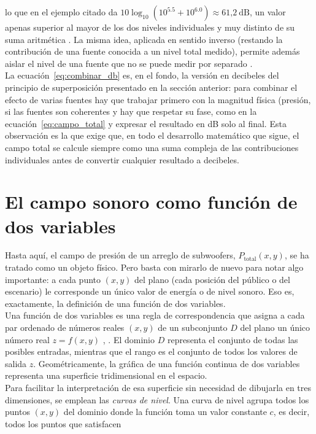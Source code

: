 lo que en el ejemplo citado da $10\log_{10}(10^{5.5}+10^{6.0})\approx
61\text{,}2\ \text{dB}$, un valor apenas superior al mayor de los dos
niveles individuales y muy distinto de su suma aritmética
\cite[pág.~36]{everest2001}. La misma idea, aplicada en sentido inverso
(restando la contribución de una fuente conocida a un nivel total
medido), permite además aislar el nivel de una fuente que no se puede
medir por separado \cite[pág.~36]{everest2001}.\\

La ecuación~\eqref{eq:combinar_db} es, en el fondo, la versión en
decibeles del principio de superposición presentado en la sección
anterior: para combinar el efecto de varias fuentes hay que trabajar
primero con la magnitud física (presión, si las fuentes son coherentes
y hay que respetar su fase, como en la
ecuación~\eqref{eq:campo_total} y expresar el resultado en dB solo al
final. Esta observación es la que exige que, en todo el desarrollo
matemático que sigue, el campo total se calcule siempre como una suma
compleja de las contribuciones individuales antes de convertir
cualquier resultado a decibeles.

\section{El campo sonoro como función de dos variables}
\label{sec:campo_total}

\noindent Hasta aquí, el campo de presión de un arreglo de subwoofers,
\(P_{\text{total}}(x,y)\), se ha tratado como un objeto físico. Pero
basta con mirarlo de nuevo para notar algo importante: a cada punto
\((x,y)\) del plano (cada posición del público o del escenario) le
corresponde un único valor de energía o de nivel sonoro. Eso es,
exactamente, la definición de una función de dos variables.\\

Una función de dos variables es una regla de correspondencia que
asigna a cada par ordenado de números reales \((x,y)\) de un
subconjunto \(D\) del plano un único número real \(z=f(x,y)\)
\cite[cap.\ funciones de varias variables]{stewart2018},
\cite[cap.\ 12]{larson2015}. El dominio \(D\) representa el conjunto de
todas las posibles entradas, mientras que el rango es el conjunto de
todos los valores de salida \(z\). Geométricamente, la gráfica de una
función continua de dos variables representa una superficie
tridimensional en el espacio.\\

Para facilitar la interpretación de esa superficie sin necesidad de
dibujarla en tres dimensiones, se emplean las \emph{curvas de nivel}.
Una curva de nivel agrupa todos los puntos \((x,y)\) del dominio donde
la función toma un valor constante \(c\), es decir, todos los puntos que
satisfacen

